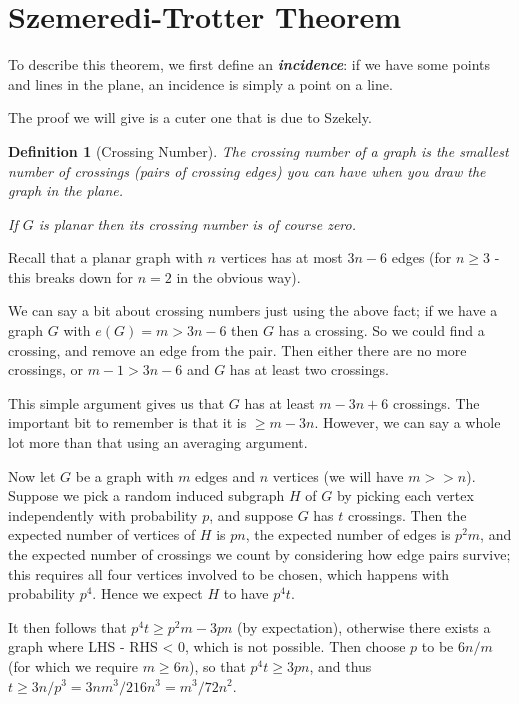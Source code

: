 \documentclass[]{article}
\theoremstyle{custhm}
\theoremstyle{cusdef}
\theoremstyle{custhm}
\theoremstyle{custhm}
\theoremstyle{custhm}
\theoremstyle{custhm}
\theoremstyle{cusdef}
\newtheorem*{defin*}{Definition}
\theoremstyle{remark}
\newcommand{\undf}[1]{\textit{\textbf{#1}}}
\begin{document}

\section{Szemeredi-Trotter Theorem}

To describe this theorem, we first define an \undf{incidence}: if we have some points and lines in the plane, an incidence is simply a point on a line.

The proof we will give is a cuter one that is due to Szekely.

\begin{defin*}[Crossing Number]
The crossing number of a graph is the smallest number of crossings (pairs of crossing edges) you can have when you draw the graph in the plane.

If $G$ is planar then its crossing number is of course zero.
\end{defin*}

Recall that a planar graph with $n$ vertices has at most $3n-6$ edges (for $n\ge 3$ - this breaks down for $n = 2$ in the obvious way).

We can say a bit about crossing numbers just using the above fact; if we have a graph $G$ with $e(G) = m > 3n-6$ then $G$ has a crossing. So we could find a crossing, and remove an edge from the pair. Then either there are no more crossings, or $m - 1 > 3n-6$ and $G$ has at least two crossings.

This simple argument gives us that $G$ has at least $m - 3n + 6$ crossings. The important bit to remember is that it is $\ge m - 3n$. However, we can say a whole lot more than that using an averaging argument.

Now let $G$ be a graph with $m$ edges and $n$ vertices (we will have $m >> n$). Suppose we pick a random induced subgraph $H$ of $G$ by picking each vertex independently with probability $p$, and suppose $G$ has $t$ crossings. Then the expected number of vertices of $H$ is $pn$, the expected number of edges is $p^2 m$, and the expected number of crossings we count by considering how edge pairs survive; this requires all four vertices involved to be chosen, which happens with probability $p^4$. Hence we expect $H$ to have $p^4t$.

It then follows that $p^4t \ge p^2m - 3pn$ (by expectation), otherwise there exists a graph where LHS - RHS < 0, which is not possible. Then choose $p$ to be $6n/m$ (for which we require $m\ge 6n$), so that $p^4t \ge 3pn$, and thus $t \ge 3n/p^3 = 3nm^3/216n^3 = m^3/72n^2$.
\end{document}
